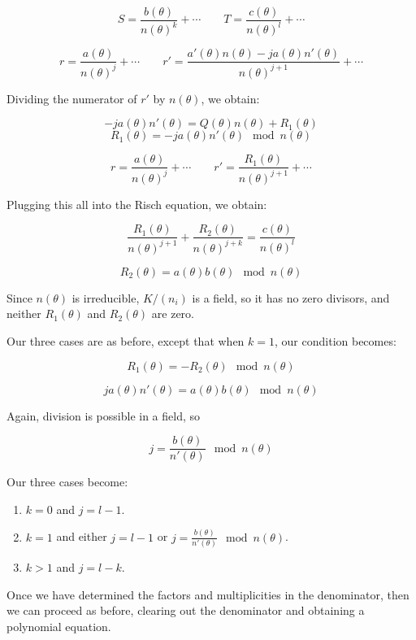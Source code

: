 $$S = \frac{b(\theta)}{n(\theta)^k} + \cdots
\qquad T = \frac{c(\theta)}{n(\theta)^l} + \cdots$$

$$r = \frac{a(\theta)}{n(\theta)^j} + \cdots  \qquad  r' = \frac{a'(\theta)n(\theta)-ja(\theta)n'(\theta)}{n(\theta)^{j+1}} + \cdots$$

Dividing the numerator of $r'$ by $n(\theta)$, we obtain:

$$-ja(\theta)n'(\theta) = Q(\theta) n(\theta) + R_1(\theta)$$
$$R_1(\theta) = -ja(\theta)n'(\theta) \mod n(\theta)$$

$$r = \frac{a(\theta)}{n(\theta)^j} + \cdots  \qquad  r' = \frac{R_1(\theta)}{n(\theta)^{j+1}} + \cdots$$

Plugging this all into the Risch equation, we obtain:

$$\frac{R_1(\theta)}{n(\theta)^{j+1}} + \frac{R_2(\theta)}{n(\theta)^{j+k}} = \frac{c(\theta)}{n(\theta)^l}$$

$$R_2(\theta) = a(\theta)b(\theta) \mod n(\theta)$$

Since $n(\theta)$ is irreducible, $K/(n_i)$ is a field, so it has no zero divisors, and
neither $R_1(\theta)$ and $R_2(\theta)$ are zero.

Our three cases are as before, except that when $k=1$, our condition becomes:

$$R_1(\theta) = -R_2(\theta) \mod n(\theta)$$

$$ja(\theta)n'(\theta) = a(\theta)b(\theta) \mod n(\theta)$$

Again, division is possible in a field, so

$$j = \frac{b(\theta)}{n'(\theta)} \mod n(\theta)$$

Our three cases become:

\begin{enumerate}

\item $k=0$ and $j = l-1$.

\item $k=1$ and either $j=l-1$ or $j = \frac{b(\theta)}{n'(\theta)} \mod n(\theta)$.

\item $k>1$ and $j=l-k$.

\end{enumerate}

Once we have determined the factors and multiplicities in the denominator,
then we can proceed as before, clearing out the denominator and obtaining
a polynomial equation.

\vfill\eject

